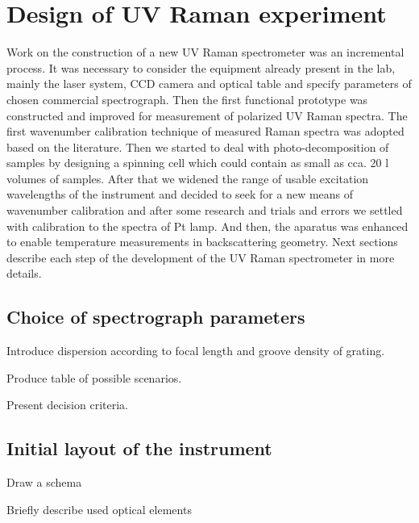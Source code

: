 \section{Design of UV Raman experiment}

Work on the construction of a new UV Raman spectrometer was an incremental
process. It was necessary to consider the equipment already present in the lab,
mainly the laser system, CCD camera and optical table and specify parameters of
chosen commercial spectrograph. Then the first functional prototype was
constructed and improved for measurement of polarized UV Raman spectra. The
first wavenumber calibration technique of measured Raman spectra
was adopted based on the literature. Then we started to deal with
photo-decomposition of samples by designing a spinning cell which could contain
as small as cca. 20 l volumes of samples. After that we widened the range
of usable excitation wavelengths of the instrument and decided to seek for a
new means of wavenumber calibration and after some research and trials and
errors we settled with calibration to the spectra of Pt lamp. And then, the
aparatus was enhanced to enable temperature measurements in backscattering
geometry. Next sections describe each step of the development of the UV Raman
spectrometer in more details.


\subsection{Choice of spectrograph parameters}
\begin{docitemize}
	\item Introduce dispersion according to focal length and groove density of
	grating.
	\item Produce table of possible scenarios.
	\item Present decision criteria.
\end{docitemize}


\subsection{Initial layout of the instrument}
\begin{docitemize}
	\item Draw a schema
	\item Briefly describe used optical elements
\end{docitemize}





